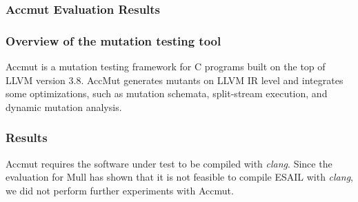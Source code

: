 \subsubsection{Accmut Evaluation Results}

\subsubsection{Overview of the mutation testing tool}

Accmut is a mutation testing framework for C programs built on the top of LLVM version 3.8. AccMut generates mutants on LLVM IR level and integrates some optimizations, such as mutation schemata, split-stream execution, and dynamic mutation analysis.

\subsubsection{Results}

Accmut requires the software under test to be compiled with \emph{clang}.
Since the evaluation for Mull has shown that it is not feasible to compile ESAIL with \emph{clang}, we did not perform further experiments with Accmut.
